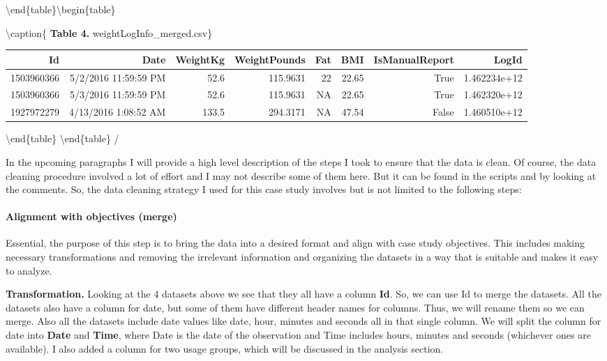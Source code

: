 \documentclass[
]{article}
\begin{document}
\textbackslash end\{table\}\textbackslash begin\{table\}

\textbackslash caption\{\label{tab:unnamed-chunk-4} \textbf{Table 4.}
weightLogInfo\_merged.csv\} \centering

\begin{tabular}[t]{r|r|r|r|r|r|r|r}
\hline
Id & Date & WeightKg & WeightPounds & Fat & BMI & IsManualReport & LogId\\
\hline
1503960366 & 5/2/2016 11:59:59 PM & 52.6 & 115.9631 & 22 & 22.65 & True & 1.462234e+12\\
\hline
1503960366 & 5/3/2016 11:59:59 PM & 52.6 & 115.9631 & NA & 22.65 & True & 1.462320e+12\\
\hline
1927972279 & 4/13/2016 1:08:52 AM & 133.5 & 294.3171 & NA & 47.54 & False & 1.460510e+12\\
\hline
\end{tabular}

\textbackslash end\{table\} \textbackslash end\{table\} /

In the upcoming paragraphs I will provide a high level description of
the steps I took to ensure that the data is clean. Of course, the data
cleaning procedure involved a lot of effort and I may not describe some
of them here. But it can be found in the scripts and by looking at the
comments. So, the data cleaning strategy I used for this case study
involves but is not limited to the following steps:

\hypertarget{alignment-with-objectives-merge}{%
\paragraph{Alignment with objectives
(merge)}\label{alignment-with-objectives-merge}}

Essential, the purpose of this step is to bring the data into a desired
format and align with case study objectives. This includes making
necessary transformations and removing the irrelevant information and
organizing the datasets in a way that is suitable and makes it easy to
analyze.

\textbf{Transformation.} Looking at the 4 datasets above we see that
they all have a column \textbf{Id}. So, we can use Id to merge the
datasets. All the datasets also have a column for date, but some of them
have different header names for columns. Thus, we will rename them so we
can merge. Also all the datasets include date values like date, hour,
minutes and seconds all in that single column. We will split the column
for date into \textbf{Date} and \textbf{Time}, where Date is the date of
the observation and Time includes hours, minutes and seconds (whichever
ones are available). I also added a column for two usage groups, which
will be discussed in the analysis section.
\end{document}
